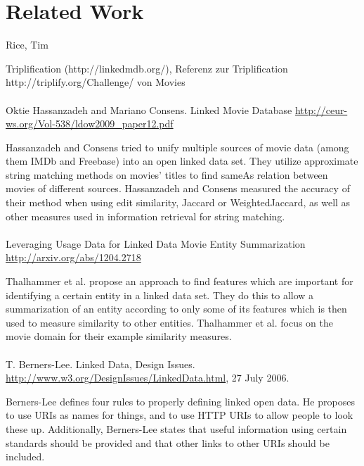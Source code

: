 \section{Related Work}
\label{sec_related_work}

Rice, Tim

Triplification (http://linkedmdb.org/), Referenz zur Triplification http://triplify.org/Challenge/ von Movies\\\\

Oktie Hassanzadeh and Mariano Consens. Linked Movie Database
\url{http://ceur-ws.org/Vol-538/ldow2009_paper12.pdf}

Hassanzadeh and Consens tried to unify multiple sources of movie data (among them IMDb and Freebase) into an open linked data set.
They utilize approximate string matching methods on movies' titles to find sameAs relation between movies of different sources.
Hassanzadeh and Consens measured the accuracy of their method when using edit similarity, Jaccard or WeightedJaccard, as well as other measures used in information retrieval for string matching.\\\\

Leveraging Usage Data for Linked Data Movie Entity Summarization
\url{http://arxiv.org/abs/1204.2718}

Thalhammer et al. propose an approach to find features which are important for identifying a certain entity in a linked data set.
They do this to allow a summarization of an entity according to only some of its features which is then used to measure similarity to other entities.
Thalhammer et al. focus on the movie domain for their example similarity measures.\\\\

T. Berners-Lee. Linked Data, Design Issues.
\url{http://www.w3.org/DesignIssues/LinkedData.html}, 27 July 2006.

Berners-Lee defines four rules to properly defining linked open data.
He proposes to use URIs as names for things, and to use HTTP URIs to allow people to look these up.
Additionally, Berners-Lee states that useful information using certain standards should be provided and that other links to other URIs should be included.